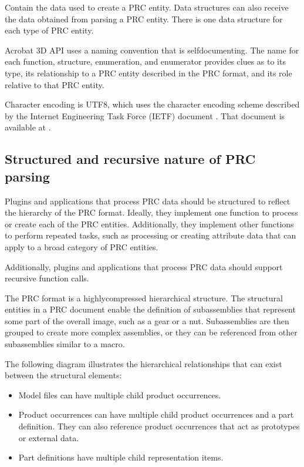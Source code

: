 \documentclass[letterpaper,12pt,english,openany,oneside]{sphinxmanual}
\begin{document}
 Contain the data used to create a PRC entity. Data structures can also receive the data obtained from parsing a PRC entity. There is one data structure for each type of PRC entity.

Acrobat 3D API uses a naming convention that is self\sphinxhyphen{}documenting. The name for each function, structure, enumeration, and enumerator provides clues as to its type, its relationship to a PRC entity described in the PRC format, and its role relative to that PRC entity.

Character encoding is UTF\sphinxhyphen{}8, which uses the character encoding scheme described by the Internet Engineering Task Force (IETF) document . That document is available at .


\subsection{Structured and recursive nature of PRC parsing}
\label{\detokenize{Plugins_A3D_API:structured-and-recursive-nature-of-prc-parsing}}
Plugins and applications that process PRC data should be structured to reflect the hierarchy of the PRC format. Ideally, they implement one function to process or create each of the PRC entities. Additionally, they implement other functions to perform repeated tasks, such as processing or creating attribute data that can apply to a broad category of PRC entities.

Additionally, plugins and applications that process PRC data should support recursive function calls.

The PRC format is a highly\sphinxhyphen{}compressed hierarchical structure. The structural entities in a PRC document enable the definition of subassemblies that represent some part of the overall image, such as a gear or a nut. Subassemblies are then grouped to create more complex assemblies, or they can be referenced from other subassemblies similar to a macro.

The following diagram illustrates the hierarchical relationships that can exist between the structural elements:
\begin{itemize}
\item {} 
Model files can have multiple child product occurrences.

\item {} 
Product occurrences can have multiple child product occurrences and a part definition. They can also reference product occurrences that act as prototypes or external data.

\item {} 
Part definitions have multiple child representation items.

\end{itemize}
\end{document}
